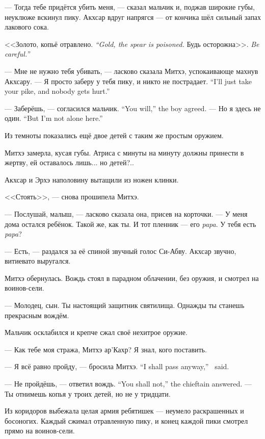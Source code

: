 --- Тогда тебе придётся убить меня, --- сказал мальчик и, поджав широкие губы, неуклюже вскинул пику.
Акхсар вдруг напрягся --- от кончика шёл сильный запах лакового сока.

{<<Золото, копьё отравлено.}
{\emph{``Gold, the spear is poisoned.}}
{Будь осторожна>>.}
{\emph{Be careful.''}}

--- Мне не нужно тебя убивать, --- ласково сказала Митхэ, успокаивающе махнув Акхсару.
{--- Я просто заберу у тебя пику, и никто не пострадает.}
{``I'll just take your pike, and nobody gets hurt.''}

{--- Заберёшь, --- согласился мальчик.}
{``You will,'' the boy agreed.}
{--- Но я здесь не один.}
{``But I'm not alone here.''}

Из темноты показались ещё двое детей с таким же простым оружием.

Митхэ замерла, кусая губы. Атриса с минуты на минуту должны принести в жертву, ей оставалось лишь... но детей?..

Акхсар и Эрхэ наполовину вытащили из ножен клинки.

<<Стоять>>, --- снова прошипела Митхэ.

--- Послушай, малыш, --- ласково сказала она, присев на корточки.
--- У меня дома остался ребёнок.
Такой же, как ты. И тот пленник --- его \textit{papa}. У тебя есть \textit{papa}?

--- Есть, --- раздался за её спиной звучный голос Си-Абву.
Акхсар звучно, витиевато выругался.

Митхэ обернулась.
Вождь стоял в парадном облачении, без оружия, и смотрел на воинов-сели.

--- Молодец, сын.
Ты настоящий защитник святилища.
Однажды ты станешь прекрасным вождём.

Мальчик осклабился и крепче сжал своё нехитрое оружие.

--- Как тебе моя стража, Митхэ ар’Кахр?
Я знал, кого поставить.

{--- Я всё равно пройду, --- бросила Митхэ.}
{``I shall pass anyway,'' \Mitchoe\ said.}

{--- Не пройдёшь, --- ответил вождь.}
{``You shall not,'' the chieftain answered.}
--- Ты отнимешь копья у троих детей, но не у тридцати.

Из коридоров выбежала целая армия ребятишек --- неумело раскрашенных и босоногих.
Каждый сжимал отравленную пику, и конец каждой пики смотрел прямо на воинов-сели.

